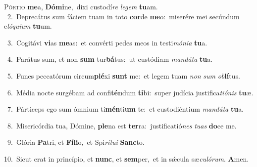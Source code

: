 \lettrine{\initial\textcolor{\initialcolor}{P}}{órtio} \textbf{me}\-a, \textbf{Dó}\-\textbf{mi}ne,~\star dixi custodí\textit{re} \textit{le}\-\textit{gem} \textbf{tu}\-am.\\
{\numbfont\textcolor{\numbcolor}{~2.}}~Deprecátus sum fáciem tuam in toto \textbf{cor}\-de \textbf{me}\-o:~\star miserére mei secúndum e\-\textit{ló}\-\textit{qui}\textit{um} \textbf{tu}\-um.\par
{\numbfont\textcolor{\numbcolor}{~3.}}~Cogitávi \textbf{vi}\-as \textbf{me}\-as:~\star et convérti pedes meos in testi\-\textit{mó}\-\textit{ni}\textit{a} \textbf{tu}\-a.\par
{\numbfont\textcolor{\numbcolor}{~4.}}~Parátus sum, et non \textbf{sum} tur\-\textbf{bá}\-tus:~\star ut custódiam \textit{man}\-\textit{dá}\textit{ta} \textbf{tu}\-a.\par
{\numbfont\textcolor{\numbcolor}{~5.}}~Funes peccatórum circum\-\textbf{plé}\-xi \textbf{sunt} me:~\star et legem tuam \textit{non} \textit{sum} \textit{ob}\-\textbf{lí}tus.\par
{\numbfont\textcolor{\numbcolor}{~6.}}~Média nocte surgébam ad confi\-\textbf{tén}\-dum \textbf{ti}\-bi:~\star super judícia justifica\-\textit{ti}\-\textit{ó}\textit{nis} \textbf{tu}\-æ.\par
{\numbfont\textcolor{\numbcolor}{~7.}}~Párticeps ego sum ómnium ti\-\textbf{mén}\-ti\textbf{um} te:~\star et custodiéntium \textit{man}\-\textit{dá}\textit{ta} \textbf{tu}\-a.\par
{\numbfont\textcolor{\numbcolor}{~8.}}~Misericórdia tua, Dómine, \textbf{ple}\-na est \textbf{ter}\-ra:~\star justificatió\textit{nes} \textit{tu}\-\textit{as} \textbf{do}\-ce me.\par
{\numbfont\textcolor{\numbcolor}{~9.}}~Glória \textbf{Pa}\-tri, et \textbf{Fí}\-\textbf{li}o,~\star et Spi\-\textit{rí}\-\textit{tu}\textit{i} \textbf{Sanc}\-to.\par
{\numbfont\textcolor{\numbcolor}{10.}}~Sicut erat in princípio, et \textbf{nunc}\-, et \textbf{sem}\-per,~\star et in sǽcula sæ\-\textit{cu}\-\textit{ló}\textit{rum}. \textbf{A}\-men.\par
